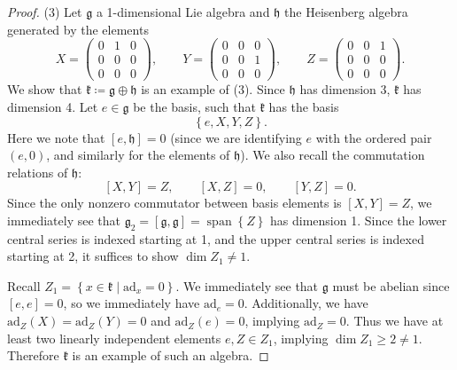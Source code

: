\documentclass[11pt, letterpaper]{article}
\theoremstyle{plain}
\begin{document}
\begin{proof}
	(3) Let $\mathfrak{g} $ a 1-dimensional Lie algebra and $\mathfrak{h} $ the Heisenberg algebra generated by the elements
	\[
		X=\begin{pmatrix}
		0 & 1 & 0 \\
		0 & 0 & 0 \\
		0 & 0 & 0
		\end{pmatrix},\qquad Y = \begin{pmatrix}
		0 & 0 & 0 \\
		0 & 0 & 1 \\
		0 & 0 & 0
		\end{pmatrix},\qquad Z = \begin{pmatrix}
		0 & 0 & 1 \\
		0 & 0 & 0 \\
		0 & 0 & 0
		\end{pmatrix}
	.\]
	We show that $\mathfrak{k} \coloneqq \mathfrak{g} \oplus \mathfrak{h} $ is an example of (3). Since $\mathfrak{h} $ has dimension 3, $\mathfrak{k} $ has dimension 4. Let $e\in \mathfrak{g} $ be the basis, such that $\mathfrak{k} $ has the basis
	\[
		\left\{ e,X,Y,Z \right\} 
	.\]
	Here we note that $[e,\mathfrak{h} ]=0$ (since we are identifying $e$ with the ordered pair $(e,0)$, and similarly for the elements of $\mathfrak{h} $). We also recall the commutation relations of $\mathfrak{h} $:
	\[
		[X,Y]=Z,\qquad [X,Z] =0,\qquad  [Y,Z] = 0
	.\]
	Since the only nonzero commutator between basis elements is $[X,Y]=Z$, we immediately see that $\mathfrak{g} _2 = [\mathfrak{g} ,\mathfrak{g} ] = \operatorname{span} \left\{ Z \right\} $ has dimension 1. Since the lower central series is indexed starting at 1, and the upper central series is indexed starting at 2, it suffices to show $\dim Z_1 \neq 1$.

	Recall $Z_1 = \left\{ x\in \mathfrak{k} \mid \mathrm{ad} _x=0 \right\} $. We immediately see that $\mathfrak{g} $ must be abelian since $[e,e]=0$, so we immediately have $\mathrm{ad} _e=0$. Additionally, we have $\mathrm{ad} _Z(X) =\mathrm{ad} _Z(Y) = 0$ and $\mathrm{ad} _Z(e)=0$, implying $\mathrm{ad} _Z =0$. Thus we have at least two linearly independent elements $e,Z\in Z_1$, implying $\dim Z_1 \geq 2 \neq 1$. Therefore $\mathfrak{k} $ is an example of such an algebra.
\end{proof}
\end{document}
